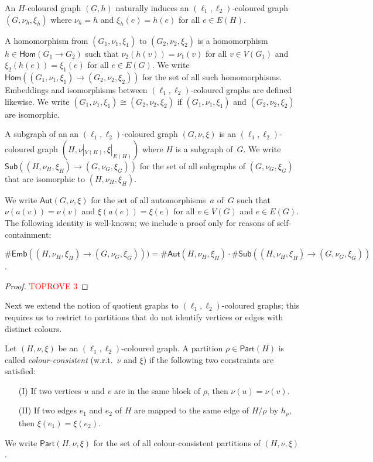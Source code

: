 \documentclass[authorcolumns,numberwithinsect]{no-lipics-v2022}
\newcommand{\homs}[2]{\mathsf{Hom}(#1 \to #2)}
\newcommand{\embs}[2]{\mathsf{Emb}(#1 \to #2)}
\newcommand{\auts}{\mathsf{Aut}}
\newcommand{\subs}[2]{\mathsf{Sub}(#1 \to #2)}
\newcommand{\ppart}{\ensuremath{\mathsf{Part}}}
\begin{document}
\begin{remark}
   An $H$-coloured graph $(G,h)$ naturally induces an $(\ell_1,\ell_2)$-coloured graph $(G,\nu_h,\xi_h)$ where $\nu_h=h$ and $\xi_h(e)=h(e)$ for all $e\in E(H)$.
\end{remark}


A homomorphism from $(G_1,\nu_1,\xi_1)$ to $(G_2,\nu_2,\xi_2)$ is a homomorphism $h\in \homs{G_1}{G_2}$ such that $\nu_2(h(v))=\nu_1(v)$ for all $v\in V(G_1)$ and $\xi_2(h(e))= \xi_1(e)$ for all $e\in E(G)$. We write $\homs{(G_1,\nu_1,\xi_1)}{(G_2,\nu_2,\xi_2)}$ for the set of all such homomorphisms. Embeddings and isomorphisms between $(\ell_1,\ell_2)$-coloured graphs are defined likewise. We write $(G_1,\nu_1,\xi_1)\cong (G_2,\nu_2,\xi_2)$ if $(G_1,\nu_1,\xi_1)$ and $(G_2,\nu_2,\xi_2)$ are isomorphic.

A subgraph of an an $(\ell_1,\ell_2)$-coloured graph $(G,\nu,\xi)$ is an $(\ell_1,\ell_2)$-coloured graph $(H,\nu|_{V(H)},\xi|_{E(H)})$ where $H$ is a subgraph of~$G$. 
We write $\subs{(H,\nu_H,\xi_H)}{(G,\nu_G,\xi_G)}$ for the set of all subgraphs of $(G,\nu_G,\xi_G)$ that are isomorphic to $(H,\nu_H,\xi_H)$.

We write $\auts(G,\nu,\xi)$ for the set of all automorphisms~$a$ of~$G$ such that $\nu(a(v))=\nu(v)$ and $\xi(a(e))=\xi(e)$ for all $v \in V(G)$ and $e\in E(G)$. The following identity is well-known; we include a proof only for reasons of self-containment:

\begin{proposition}\label{prop:col_subs_to_embs}
    $\#\embs{(H,\nu_H,\xi_H)}{(G,\nu_G,\xi_G))} = \#\auts(H,\nu_H,\xi_H)\cdot \#\subs{(H,\nu_H,\xi_H)}{(G,\nu_G,\xi_G)}$.
\end{proposition}
\begin{proof}\textcolor{red}{TOPROVE 3}\end{proof}

Next we extend the notion of quotient graphs to $(\ell_1,\ell_2)$-coloured graphs; this requires us to restrict to partitions that do not identify vertices or edges with distinct colours.

\begin{definition}
    Let $(H,\nu,\xi)$ be an $(\ell_1,\ell_2)$-coloured graph. A partition $\rho \in \ppart(H)$ is called \emph{colour-consistent} (w.r.t.\ $\nu$ and $\xi$) if the following two constraints are satisfied:
    \begin{itemize}
        \item[(I)] If two vertices $u$ and $v$ are in the same block of $\rho$, then $\nu(u)=\nu(v)$.
        \item[(II)] If two edges $e_1$ and $e_2$ of $H$ are mapped to the same edge of $H/\rho$ by $h_\rho$, then $\xi(e_1)=\xi(e_2)$. 
    \end{itemize}
    We write $\ppart(H,\nu,\xi)$ for the set of all colour-consistent partitions of $(H,\nu,\xi)$.
\end{definition}
\end{document}
